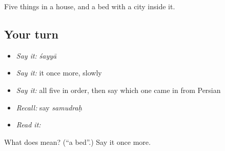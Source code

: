 \begin{grammarlens}[title={What you've built}]
Five things in a house, and a bed with a city inside it.
\end{grammarlens}

\subsection*{Your turn}
\begin{itemize}
\raggedright
  \item \emph{Say it:} \emph{śayyā}
  \item \emph{Say it:} it once more, slowly
  \item \emph{Say it:} all five in order, then say which one came in from Persian
  \item \emph{Recall:} say \emph{samudraḥ}
  \item \emph{Read it:} \textbf{}
\end{itemize}

\begin{tcolorbox}[breakable,colback=teal!4,colframe=teal!35!black,title={Before you move on}]
What does  mean? (\textquotedblleft{}a bed\textquotedblright{}.) Say it once more.
\end{tcolorbox}
